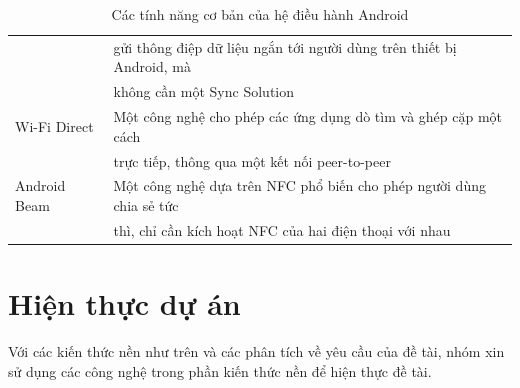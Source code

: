 \documentclass[a4paper]{article}
\begin{document}
\begin{table}[h]
\begin{tabular}{|l|l|}
				 & gửi thông điệp dữ liệu ngắn tới người dùng trên thiết bị Android, mà  \\
				 & không cần một Sync Solution \\
\hline
Wi-Fi Direct 	 & Một công nghệ cho phép các ứng dụng dò tìm và ghép cặp một cách \\ 
				 & trực tiếp, thông qua một kết nối peer-to-peer \\
\hline
Android Beam 	 & Một công nghệ dựa trên NFC phổ biến cho phép người dùng chia sẻ tức \\ 
				 & thì, chỉ cần kích hoạt NFC của hai điện thoại với nhau \\
\hline
\end{tabular}
\caption{Các tính năng cơ bản của hệ điều hành Android}
\label{my-label}
\end{table}
\section{Hiện thực dự án}
Với các kiến thức nền như trên và các phân tích về yêu cầu của đề tài, nhóm xin sử dụng các công nghệ trong phần kiến thức nền để hiện thực đề tài.
\end{document}
